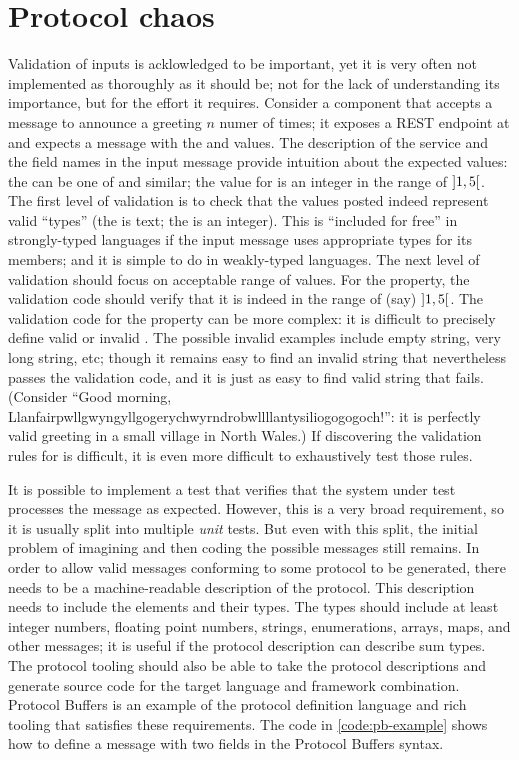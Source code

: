 \section{Protocol chaos}
Validation of inputs is acklowledged to be important, yet it is very often not implemented as thoroughly as it should be; not for the lack of understanding its importance, but for the effort it requires. Consider a component that accepts a message to announce a greeting $n$ numer of times; it exposes a REST endpoint at  and expects a message with the  and  values. The description of the service and the field names in the input message provide intuition about the expected values: the  can be one of  and similar; the value for  is an integer in the range of $\interval[open]{1}{5}$. The first level of validation is to check that the values posted indeed represent valid ``types'' (the  is text; the  is an integer). This is ``included for free'' in strongly-typed languages if the input message uses appropriate types for its members; and it is simple to do in weakly-typed languages. The next level of validation should focus on acceptable range of values. For the  property, the validation code should verify that it is indeed in the range of (say) $\interval[open]{1}{5}$. The validation code for the  property can be more complex: it is difficult to precisely define valid or invalid . The possible invalid examples include empty string, very long string, etc; though it remains easy to find an invalid string that nevertheless passes the validation code, and it is just as easy to find valid string that fails. (Consider ``Good morning, Llanfairpwllgwyngyllgogerychwyrndrobwllllantysiliogogogoch!'': it is perfectly valid greeting in a small village in North Wales.) If discovering the validation rules for  is difficult, it is even more difficult to exhaustively test those rules. 

It is possible to implement a test that verifies that the system under test processes the message as expected. However, this is a very broad requirement, so it is usually split into multiple \emph{unit} tests. But even with this split, the initial problem of imagining and then coding the possible messages still remains. In order to allow valid messages conforming to some protocol to be generated, there needs to be a machine-readable description of the protocol. This description needs to include the elements and their types. The types should include at least integer numbers, floating point numbers, strings, enumerations, arrays, maps, and other messages; it is useful if the protocol description can describe sum types. The protocol tooling should also be able to take the protocol descriptions and generate source code for the target language and framework combination. Protocol Buffers \cite{protobuf} is an example of the protocol definition language and rich tooling that satisfies these requirements. The code in \autoref{code:pb-example} shows how to define a message  with two fields in the Protocol Buffers syntax.

